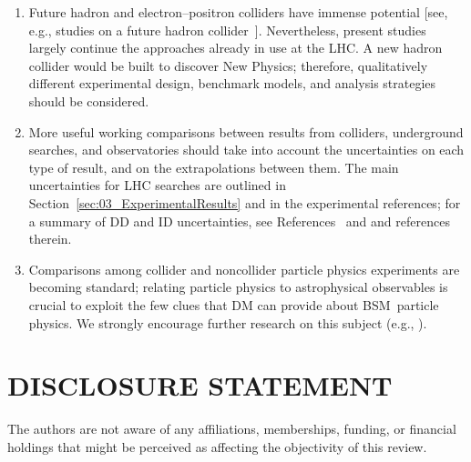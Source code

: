 \documentclass{ar-1col}
\begin{document}
{\begin{issues}
\begin{enumerate}
\begin{itemize}
\item Upgrades for Run 3 and HL-LHC provide new capabilities that may make
new data more valuable for these searches than what recorded so far
for rare processes involving light new particles. This is a subject that has been largely
unexplored for ATLAS and CMS~\cite{Alves:2016cqf} and that can be developed
further when tracking information is available at the trigger level to remove pileup.
LHCb will make use of a novel triggerless detector readout to
perform dark photon searches with unprecedented
sensitivities~\cite{Ilten:2016tkc}. 

\end{itemize}

\item Future hadron and electron--positron colliders have immense
potential [see, e.g., studies on a future hadron
collider~\cite{Golling:2016gvc}]. Nevertheless, present studies
largely continue the approaches already in use at the LHC. A new
hadron collider would be built to discover New Physics;
therefore, qualitatively different experimental design, benchmark
models, and analysis strategies should be considered.

\item More useful working comparisons between results from colliders,
underground searches, and observatories should take into account
the uncertainties on each type of result, and on the
extrapolations between them. The main uncertainties for LHC
searches are outlined in
Section~\ref{sec:03_ExperimentalResults} and in the experimental
references; for a summary of DD and ID uncertainties, see
References~ and  and
references therein.

\item Comparisons among collider and noncollider particle physics
experiments are becoming standard; relating particle physics to
astrophysical observables is crucial to exploit the few clues that
DM can provide about BSM\ particle physics. We
strongly encourage further research on this subject (e.g.,
).
\end{enumerate}
\end{issues}


\section*{DISCLOSURE STATEMENT}

The authors are not aware of any affiliations, memberships,
funding, or financial holdings that might be perceived as
affecting the objectivity of this review.

}
\end{document}
